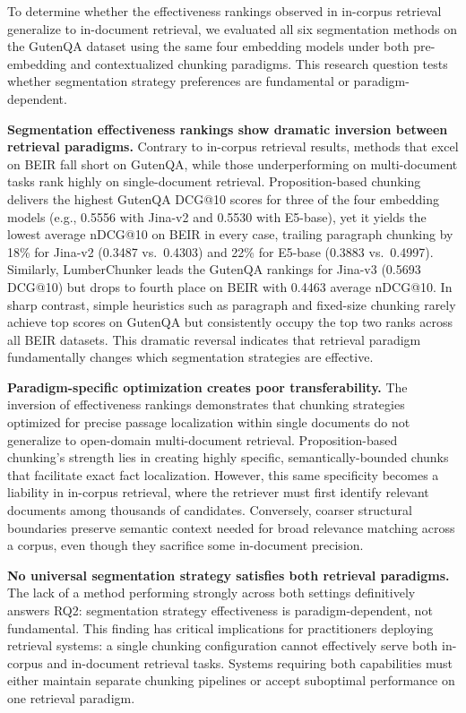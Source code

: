 To determine whether the effectiveness rankings observed in in-corpus retrieval generalize to in-document retrieval, we evaluated all six segmentation methods on the GutenQA dataset using the same four embedding models under both pre-embedding and contextualized chunking paradigms. This research question tests whether segmentation strategy preferences are fundamental or paradigm-dependent.

\textbf{Segmentation effectiveness rankings show dramatic inversion between retrieval paradigms.} Contrary to in-corpus retrieval results, methods that excel on BEIR fall short on GutenQA, while those underperforming on multi-document tasks rank highly on single-document retrieval. Proposition-based chunking delivers the highest GutenQA DCG@10 scores for three of the four embedding models (e.g., 0.5556 with Jina-v2 and 0.5530 with E5-base), yet it yields the lowest average nDCG@10 on BEIR in every case, trailing paragraph chunking by 18\% for Jina-v2 (0.3487 vs.\ 0.4303) and 22\% for E5-base (0.3883 vs.\ 0.4997). Similarly, LumberChunker leads the GutenQA rankings for Jina-v3 (0.5693 DCG@10) but drops to fourth place on BEIR with 0.4463 average nDCG@10. In sharp contrast, simple heuristics such as paragraph and fixed-size chunking rarely achieve top scores on GutenQA but consistently occupy the top two ranks across all BEIR datasets. This dramatic reversal indicates that retrieval paradigm fundamentally changes which segmentation strategies are effective.

\textbf{Paradigm-specific optimization creates poor transferability.} The inversion of effectiveness rankings demonstrates that chunking strategies optimized for precise passage localization within single documents do not generalize to open-domain multi-document retrieval. Proposition-based chunking's strength lies in creating highly specific, semantically-bounded chunks that facilitate exact fact localization. However, this same specificity becomes a liability in in-corpus retrieval, where the retriever must first identify relevant documents among thousands of candidates. Conversely, coarser structural boundaries preserve semantic context needed for broad relevance matching across a corpus, even though they sacrifice some in-document precision.

\textbf{No universal segmentation strategy satisfies both retrieval paradigms.} The lack of a method performing strongly across both settings definitively answers RQ2: segmentation strategy effectiveness is paradigm-dependent, not fundamental. This finding has critical implications for practitioners deploying retrieval systems: a single chunking configuration cannot effectively serve both in-corpus and in-document retrieval tasks. Systems requiring both capabilities must either maintain separate chunking pipelines or accept suboptimal performance on one retrieval paradigm.





